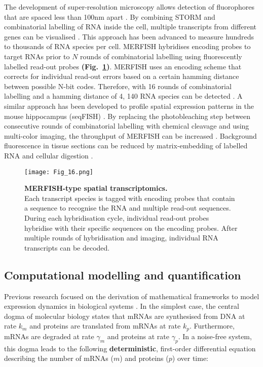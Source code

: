 The development of super-resolution microscopy allows detection of fluorophores that are spaced less than 100nm apart \citep{Sydor2015}. By combining \gls{STORM} and combinatorial labelling of RNA inside the cell, multiple transcripts from different genes can be visualised \citep{Lubeck2012}. This approach has been advanced to measure hundreds to thousands of RNA species per cell. \Gls{MERFISH} hybridises encoding probes to target RNAs prior to $N$ rounds of combinatorial labelling using fluorescently labelled read-out probes \textbf{(Fig.~\ref{fig0:MERFISH})}. MERFISH uses an encoding scheme that corrects for individual read-out errors based on a certain hamming distance between possible N-bit codes. Therefore, with 16 rounds of combinatorial labelling and a hamming distance of 4, 140 RNA species can be detected \citep{Chen2015}. A similar approach has been developed to profile spatial expression patterns in the mouse hippocampus (seqFISH) \citep{Shah2016}. By replacing the photobleaching step between consecutive rounds of combinatorial labelling with chemical cleavage and using multi-color imaging, the throughput of MERFISH can be increased \citep{Moffitt2016a}. Background fluorescence in tissue sections can be reduced by matrix-embedding of labelled RNA and cellular digestion \citep{Moffitt2016}.

\begin{figure}[!h]
\centering
\texttt{[image: Fig\_16.png]}
\caption[MERFISH-type spatial transcriptomics]{\textbf{MERFISH-type spatial transcriptomics.}\\
Each transcript species is tagged with encoding probes that contain a sequence to recognise the RNA and multiple read-out sequences. During each hybridisation cycle, individual read-out probes hybridise with their specific sequences on the encoding probes. After multiple rounds of hybridisation and imaging, individual RNA transcripts can be decoded.}
\label{fig0:MERFISH}
\end{figure}

\subsection{Computational modelling and quantification}

Previous research focused on the derivation of mathematical frameworks to model expression dynamics in biological systems \citep{Tsimring2014}. In the simplest case, the central dogma of molecular biology states that mRNAs are synthesised from DNA at rate $k_m$ and proteins are translated from mRNAs at rate $k_p$. Furthermore, mRNAs are degraded at rate $\gamma_m$ and proteins at rate $\gamma_p$. In a noise-free system, this dogma leads to the following \textbf{deterministic}, first-order differential equation describing the number of mRNAs ($m$) and proteins ($p$) over time:

